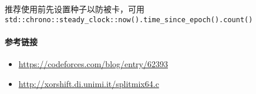 推荐使用前先设置种子以防被卡，可用 \verb|std::chrono::steady_clock::now().time_since_epoch().count()|

\paragraph{参考链接}

\begin{itemize}
    \item \url{https://codeforces.com/blog/entry/62393}
    \item \url{http://xorshift.di.unimi.it/splitmix64.c}
\end{itemize}